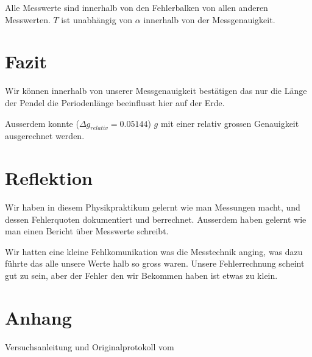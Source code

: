 \documentclass[12pt, a4paper, twoside]{article}
\begin{document}
Alle Messwerte sind innerhalb von den Fehlerbalken von allen anderen Messwerten.
$T$ ist unabhängig von $\alpha$ innerhalb von der Messgenauigkeit.
\section{Fazit}
Wir können innerhalb von unserer Messgenauigkeit bestätigen das nur die Länge der Pendel die Periodenlänge beeinflusst hier auf der Erde.
\par
Ausserdem konnte ($\Delta g_{relativ} = 0.05144$) $g$ mit einer relativ grossen Genauigkeit ausgerechnet werden.

\section{Reflektion}
Wir haben in diesem Physikpraktikum gelernt wie man Messungen macht, und dessen Fehlerquoten dokumentiert und berrechnet.
Ausserdem haben gelernt wie man einen Bericht über Messwerte schreibt.

Wir hatten eine kleine Fehlkomunikation was die Messtechnik anging, was dazu führte das alle unsere Werte halb so gross waren.
Unsere Fehlerrechnung scheint gut zu sein, aber der Fehler den wir Bekommen haben ist etwas zu klein.
\section{Anhang}
Versuchsanleitung und Originalprotokoll vom \labdate
\end{document}
